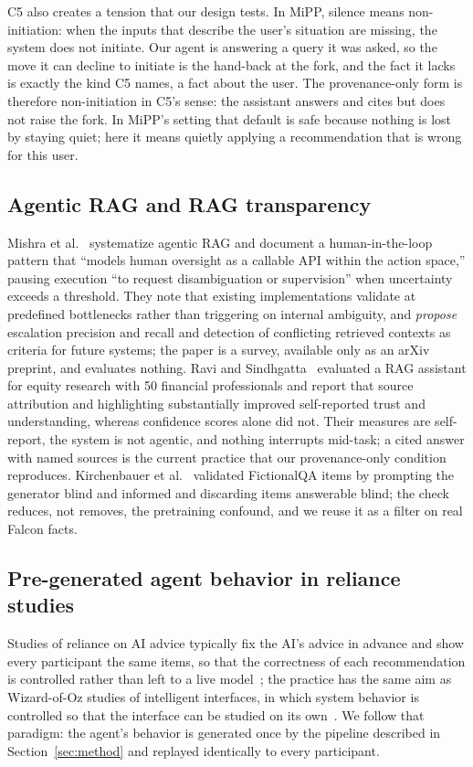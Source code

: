 \documentclass[manuscript,review]{acmart}
\begin{document}
C5 also creates a tension that our design tests. In MiPP, silence means
non-initiation: when the inputs that describe the user's situation are
missing, the system does not initiate. Our agent is answering a query it
was asked, so the move it can decline to initiate is the hand-back at the
fork, and the fact it lacks is exactly the kind C5 names, a fact about the
user. The provenance-only form is therefore non-initiation in C5's sense:
the assistant answers and cites but does not raise the fork. In MiPP's
setting that default is safe because nothing is lost by staying quiet;
here it means quietly applying a recommendation that is wrong for this
user.

\subsection{Agentic RAG and RAG transparency}
Mishra et al.~\cite{mishra2026} systematize agentic RAG and document a
human-in-the-loop pattern that ``models human oversight as a callable API
within the action space,'' pausing execution ``to request disambiguation
or supervision'' when uncertainty exceeds a threshold. They note that
existing implementations validate at predefined bottlenecks rather than
triggering on internal ambiguity, and \emph{propose} escalation precision
and recall and detection of conflicting retrieved contexts as criteria
for future systems; the paper is a survey, available only as an arXiv
preprint, and evaluates nothing. Ravi and Sindhgatta~\cite{ravi2025}
evaluated a RAG assistant for equity research with 50 financial
professionals and report that source attribution and highlighting
substantially improved self-reported trust and understanding, whereas
confidence scores alone did not.
Their measures are self-report, the system is not agentic, and nothing
interrupts mid-task; a cited answer with named sources is the current
practice that our provenance-only condition reproduces. Kirchenbauer et
al.~\cite{kirchenbauer2026} validated FictionalQA items by prompting the
generator blind and informed and discarding items answerable blind; the
check reduces, not removes, the pretraining confound, and we reuse it as a
filter on real Falcon facts.

\subsection{Pre-generated agent behavior in reliance studies}
Studies of reliance on AI advice typically fix the AI's advice in advance
and show every participant the same items, so that the correctness of each
recommendation is controlled rather than left to a live
model~\cite{bucinca2021,vasconcelos2023}; the practice has the same aim
as Wizard-of-Oz studies of intelligent interfaces, in which system
behavior is controlled so that the interface can be studied on its
own~\cite{dahlback1993}. We follow that paradigm: the
agent's behavior is generated once by the pipeline described in
Section~\ref{sec:method} and replayed identically to every participant.
\end{document}
